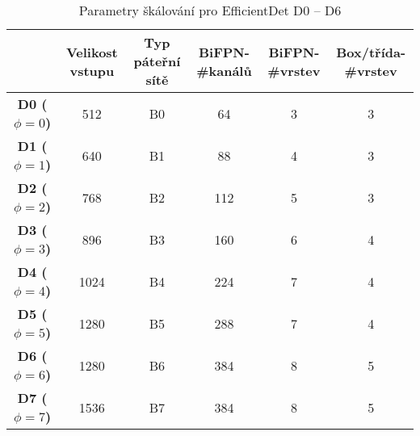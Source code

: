 \begin{table}[!htbp]
\centering
\begin{tabular}{|c|c|c|c|c|c|}
\hline
            & \textbf{Velikost vstupu} & \textbf{Typ páteřní sítě} & \textbf{BiFPN-\#kanálů} & \textbf{BiFPN-\#vrstev} & \textbf{Box/třída-\#vrstev} \\ \hline
\textbf{D0 ($\phi = 0$)} & 512                      & B0                        & 64                            & 3                             & 3                                                      \\ \hline
\textbf{D1 ($\phi = 1$)} & 640                      & B1                        & 88                            & 4                             & 3                                                      \\ \hline
\textbf{D2 ($\phi = 2$)} & 768                      & B2                        & 112                           & 5                             & 3                                                      \\ \hline
\textbf{D3 ($\phi = 3$)} & 896                      & B3                        & 160                           & 6                             & 4                                                      \\ \hline
\textbf{D4 ($\phi = 4$)} & 1024                     & B4                        & 224                           & 7                             & 4                                                      \\ \hline
\textbf{D5 ($\phi = 5$)} & 1280                     & B5                        & 288                           & 7                             & 4                                                      \\ \hline
\textbf{D6 ($\phi = 6$)} & 1280                     & B6                        & 384                           & 8                             & 5                                                      \\ \hline
\textbf{D7 ($\phi = 7$)} & 1536                     & B7                        & 384                           & 8                             & 5                                                      \\ \hline
\end{tabular}
\caption{Parametry škálování pro EfficientDet D0 -- D6 \cite{EfficientDet}}
\end{table}
\fi





